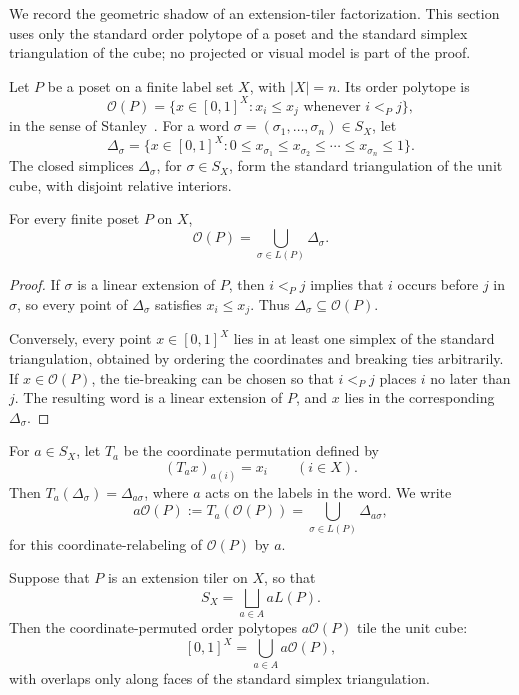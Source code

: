 We record the geometric shadow of an extension-tiler factorization.  This
section uses only the standard order polytope of a poset and the standard
simplex triangulation of the cube; no projected or visual model is part of
the proof.

Let $P$ be a poset on a finite label set $X$, with $|X|=n$.  Its order
polytope is
\[
        \mathcal O(P)=
        \{x\in [0,1]^X : x_i\le x_j \text{ whenever } i<_P j\},
\]
in the sense of Stanley~\cite{Stanley1986}.  For a word
$\sigma=(\sigma_1,\ldots,\sigma_n)\in S_X$, let
\[
        \Delta_\sigma =
        \{x\in [0,1]^X :
        0\le x_{\sigma_1}\le x_{\sigma_2}\le\cdots
        \le x_{\sigma_n}\le 1\}.
\]
The closed simplices $\Delta_\sigma$, for $\sigma\in S_X$, form the
standard triangulation of the unit cube, with disjoint relative interiors.

\begin{lemma}
\label{lem:order-polytope-standard-triangulation}
For every finite poset $P$ on $X$,
\[
        \mathcal O(P)=\bigcup_{\sigma\in L(P)}\Delta_\sigma .
\]
\end{lemma}

\begin{proof}
If $\sigma$ is a linear extension of $P$, then $i<_P j$ implies that
$i$ occurs before $j$ in $\sigma$, so every point of $\Delta_\sigma$
satisfies $x_i\le x_j$.  Thus $\Delta_\sigma\subseteq \mathcal O(P)$.

Conversely, every point $x\in [0,1]^X$ lies in at least one simplex of the
standard triangulation, obtained by ordering the coordinates and breaking
ties arbitrarily.  If $x\in\mathcal O(P)$, the tie-breaking can be chosen
so that $i<_P j$ places $i$ no later than $j$.  The resulting word is a
linear extension of $P$, and $x$ lies in the corresponding
$\Delta_\sigma$.
\end{proof}

For $a\in S_X$, let $T_a$ be the coordinate permutation defined by
\[
        (T_a x)_{a(i)}=x_i
        \qquad (i\in X).
\]
Then $T_a(\Delta_\sigma)=\Delta_{a\sigma}$, where $a$ acts on the labels
in the word.  We write
\[
        a\mathcal O(P):=T_a(\mathcal O(P))
        =\bigcup_{\sigma\in L(P)}\Delta_{a\sigma},
\]
for this coordinate-relabeling of $\mathcal O(P)$ by $a$.

\begin{proposition}
\label{prop:extension-tiler-order-polytope-cube-tiling}
Suppose that $P$ is an extension tiler on $X$, so that
\[
        S_X=\bigsqcup_{a\in A} aL(P).
\]
Then the coordinate-permuted order polytopes $a\mathcal O(P)$ tile the
unit cube:
\[
        [0,1]^X=\bigcup_{a\in A} a\mathcal O(P),
\]
with overlaps only along faces of the standard simplex triangulation.
\end{proposition}

